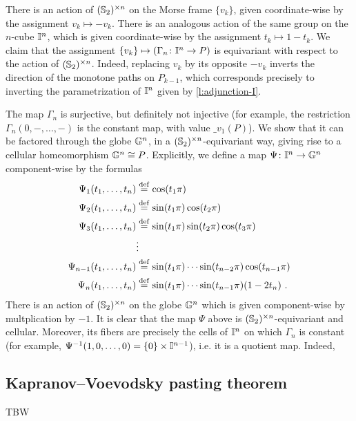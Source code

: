 There is an action of $(\mathbb{S}_2)^{\times n}$ on the Morse frame $\{ v_k \}$, given coordinate-wise by the assignment $v_k \mapsto -v_k$. 
There is an analogous action of the same group on the $n$-cube $\mathbb{I}^n$, which is given coordinate-wise by the assignment $t_k \mapsto 1-t_k$. 
We claim that the assignment $\{v_k\} \mapsto (\Gamma_n \colon \mathbb{I}^n \to P)$ is equivariant with respect to the action of $(\mathbb{S}_2)^{\times n}$.
Indeed, replacing $v_k$ by its opposite $-v_k$ inverts the direction of the monotone paths on $P_{k-1}$, which corresponds precisely to inverting the parametrization of $\mathbb{I}^n$ given by \cref{l:adjunction-I}.

The map $\Gamma_n$ is surjective, but definitely not injective (for example, the restriction $\Gamma_n(0,-,\ldots,-)$ is the constant map, with value $\bm_{v_1}(P)$). 
We show that it can be factored through the globe $\mathbb{G}^n$, in a $(\mathbb{S}_2)^{\times n}$-equivariant way, giving rise to a cellular homeomorphism $\mathbb{G}^n \cong P$. 
Explicitly, we define a map $\Psi \colon \mathbb{I}^n \to \mathbb{G}^n$ component-wise by the formulas
\begin{align*}
	\Psi_1(t_1,\ldots,t_n) & \stackrel{\mathrm{def}}{=} \cos(t_1 \pi) \\
	\Psi_2(t_1,\ldots,t_n) & \stackrel{\mathrm{def}}{=} \sin(t_1 \pi)\cos(t_2\pi) \\
	\Psi_3(t_1,\ldots,t_n) & \stackrel{\mathrm{def}}{=} \sin(t_1 \pi)\sin(t_2\pi)\cos(t_3\pi) \\
	 & \vdots \\
	\Psi_{n-1}(t_1,\ldots,t_n) & \stackrel{\mathrm{def}}{=} \sin(t_1 \pi) \cdots \sin(t_{n-2} \pi) \cos(t_{n-1} \pi) \\
	\Psi_n(t_1,\ldots,t_n) & \stackrel{\mathrm{def}}{=}  \sin(t_1 \pi) \cdots \sin(t_{n-1} \pi)  (1-2t_n)\ .
\end{align*}
There is an action of $(\mathbb{S}_2)^{\times n}$ on the globe $\mathbb{G}^n$ which is given component-wise by multplication by $-1$. 
It is clear that the map $\Psi$ above is $(\mathbb{S}_2)^{\times n}$-equivariant and cellular. 
Moreover, its fibers are precisely the cells of $\mathbb{I}^n$ on which $\Gamma_n$ is constant (for example, $\Psi^{-1}(1,0,\ldots,0)=\{0\} \times \mathbb{I}^{n-1}$), i.e. it is a quotient map. 
Indeed, 




\subsection{Kapranov--Voevodsky pasting theorem}

TBW
